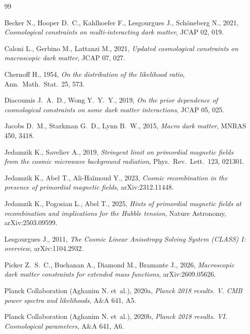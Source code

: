 \documentclass[11pt,a4paper]{article}
\begin{document}
\begin{thebibliography}{99}

Becker N., Hooper D.~C., Kahlhoefer F., Lesgourgues J., Sch\"oneberg N., 2021, \emph{Cosmological constraints on multi-interacting dark matter}, JCAP 02, 019.

Caloni L., Gerbino M., Lattanzi M., 2021, \emph{Updated cosmological constraints on macroscopic dark matter}, JCAP 07, 027.

Chernoff H., 1954, \emph{On the distribution of the likelihood ratio}, Ann.\ Math.\ Stat.\ 25, 573.

Diacoumis J.~A.~D., Wong Y.~Y.~Y., 2019, \emph{On the prior dependence of cosmological constraints on some dark matter interactions}, JCAP 05, 025.

Jacobs D.~M., Starkman G.~D., Lynn B.~W., 2015, \emph{Macro dark matter}, MNRAS 450, 3418.

Jedamzik K., Saveliev A., 2019, \emph{Stringent limit on primordial magnetic fields from the cosmic microwave background radiation}, Phys.\ Rev.\ Lett.\ 123, 021301.

Jedamzik K., Abel T., Ali-Ha\"imoud Y., 2023, \emph{Cosmic recombination in the presence of primordial magnetic fields}, arXiv:2312.11448.

Jedamzik K., Pogosian L., Abel T., 2025, \emph{Hints of primordial magnetic fields at recombination and implications for the Hubble tension}, Nature Astronomy, arXiv:2503.09599.

Lesgourgues J., 2011, \emph{The Cosmic Linear Anisotropy Solving System (CLASS) I: overview}, arXiv:1104.2932.

Picker Z.~S.~C., Buchanan A., Diamond M., Bramante J., 2026, \emph{Macroscopic dark matter constraints for extended mass functions}, arXiv:2609.05626.

Planck Collaboration (Aghanim N. et~al.), 2020a, \emph{Planck 2018 results. V. CMB power spectra and likelihoods}, A\&A 641, A5.

Planck Collaboration (Aghanim N. et~al.), 2020b, \emph{Planck 2018 results. VI. Cosmological parameters}, A\&A 641, A6.


\end{thebibliography}
\end{document}
